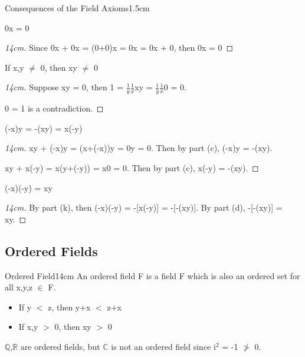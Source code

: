 \begin{ltheorem}{Consequences of the Field Axioms}{1.5cm}
		\item 0x = 0
		
			\begin{proof}[14cm]
				Since 0x + 0x = (0+0)x = 0x = 0x + 0, then 0x = 0
			\end{proof}
	
		\item If x,y $\not =$ 0, then xy $\not =$ 0

			\begin{proof}[14cm]
				Suppose xy = 0, then 1 = $\frac{1}{y}\frac{1}{x}$xy
				= $\frac{1}{y}$$\frac{1}{x}$0 = 0.

				0 = 1 is a contradiction.
			\end{proof}
				
		\item (-x)y = -(xy) = x(-y)
		
			\begin{proof}[14cm]
				xy + (-x)y = (x+(-x))y = 0y = 0.
				Then by part (c), (-x)y = -(xy).

				xy + x(-y) = x(y+(-y)) = x0 = 0.
				Then by part (c), x(-y) = -(xy).
			\end{proof}

		\item (-x)(-y) = xy
		
			\begin{proof}[14cm]
				By part (k), then (-x)(-y) = -[x(-y)] = -[-(xy)].
				By part (d), -[-(xy)] = xy.
			\end{proof}
	\end{ltheorem}

	\vspace{0.5cm}





\subsection{ Ordered Fields }

	\begin{definition}{Ordered Field}{14cm}
		An ordered field F is a field F which is also an ordered set
		for all x,y,z $\in$ F.

		\begin{itemize}[leftmargin=1.5cm, itemsep=0.1cm]
			\item If y $<$ z, then y+x $<$ z+x
		
			\item If x,y $>$ 0, then xy $>$ 0
		\end{itemize}
		
		$ \mathbb{Q} $,$ \mathbb{R} $ are ordered fields,
		but $ \mathbb{C} $ is not an ordered field since i$^2$ = -1 $\not >$ 0.
	\end{definition}
	

